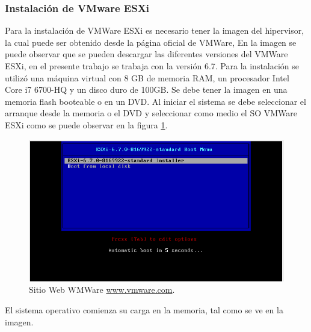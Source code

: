 

\subsubsection{Instalación de VMware ESXi}

Para la instalación de VMWare ESXi es necesario tener la imagen del hipervisor, la cual puede ser obtenido desde la página oficial de VMWare, En la imagen se puede observar que se pueden descargar las diferentes versiones del VMWare ESXi, en el presente trabajo se trabaja con la versión 6.7.
Para la instalación se utilizó una máquina virtual con 8 GB de memoria RAM, un procesador Intel Core i7 6700-HQ y un disco duro de 100GB. Se debe tener la imagen en una memoria flash booteable o en un DVD. Al iniciar el sistema se debe seleccionar el arranque desde la memoria o el DVD y seleccionar como medio el SO VMWare ESXi como se puede observar en la figura \ref{fig:VMwareInstalacion02}.

\begin{figure}[!hbtp]
	\centering
	\includegraphics[width=\linewidth]{Trabajo/RecursosEducativos/RE01_VMwareESXi/RE_VMwareInstalacion02.png}
	\vspace{-0.2cm}
	\caption{Sitio Web WMWare \url{www.vmware.com}.\footnotemark[2]{} }
	\label{fig:VMwareInstalacion02}
\end{figure}

El sistema operativo comienza su carga en la memoria, tal como se ve en la imagen.


